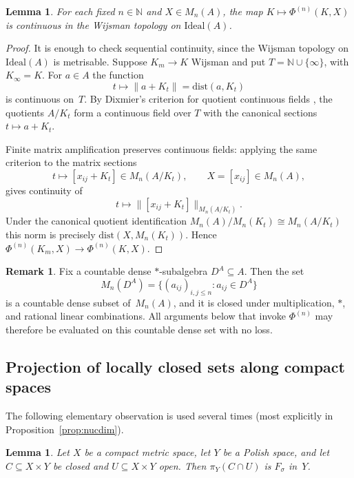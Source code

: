 \documentclass[12pt,fleqn,a4paper]{amsart}
\renewcommand{\le}{\leqslant}
\numberwithin{equation}{section}
\newtheorem{lemma}[theorem]{Lemma}
\theoremstyle{definition}
\newtheorem{remark}[theorem]{Remark}
\newcommand{\N}{\mathbb{N}}
\newcommand{\Ideal}{\mathrm{Ideal}}
\newcommand{\dist}{\mathrm{dist}}
\begin{document}
\begin{lemma}\label{lem:Phi-n-continuous}
For each fixed $n\in\N$ and $X\in M_n(A)$, the map
$K\mapsto \Phi^{(n)}(K,X)$ is continuous in the Wijsman topology on $\Ideal(A)$.
\end{lemma}

\begin{proof}
It is enough to check sequential continuity, since the Wijsman topology on
$\Ideal(A)$ is metrisable.  Suppose $K_m\to K$ Wijsman and put
$T=\N\cup\{\infty\}$, with $K_\infty=K$.  For $a\in A$ the function
\[
        t\longmapsto \|a+K_t\|=\dist(a,K_t)
\]
is continuous on~$T$.  By Dixmier's criterion for quotient continuous fields
\cite[Prop.~10.3.2]{Dixmier1977}, the quotients $A/K_t$ form a continuous field over
$T$ with the canonical sections $t\mapsto a+K_t$.

Finite matrix amplification preserves continuous fields: applying the same criterion
to the matrix sections
\[
        t\longmapsto [x_{ij}+K_t]\in M_n(A/K_t),
        \qquad X=[x_{ij}]\in M_n(A),
\]
gives continuity of
\[
        t\longmapsto \|[x_{ij}+K_t]\|_{M_n(A/K_t)}.
\]
Under the canonical quotient identification
$M_n(A)/M_n(K_t)\cong M_n(A/K_t)$ this norm is precisely
$\dist(X,M_n(K_t))$.  Hence
$\Phi^{(n)}(K_m,X)\to\Phi^{(n)}(K,X)$.
\end{proof}

\begin{remark}\label{rem:Phi-n-dense}
Fix a countable dense $*$-subalgebra $D^A\subseteq A$.  Then the set 
\[
    M_n(D^A)=\{(a_{ij})_{i,j\le n}:a_{ij}\in D^A\}
\]
is a countable dense
subset of~$M_n(A)$, and it is closed under multiplication, $*$, and rational
linear combinations.
All arguments below that invoke $\Phi^{(n)}$ may therefore be evaluated on
this countable dense set with no loss.
\end{remark}

\subsection{Projection of locally closed sets along compact spaces}

The following elementary observation is used several times (most explicitly in Proposition~\ref{prop:nucdim}).

\begin{lemma}\label{lem:proj-locally-closed}
Let $X$ be a compact metric space, let $Y$ be a Polish space, and let $C\subseteq X\times Y$ be closed and $U\subseteq X\times Y$ open.  Then $\pi_Y(C\cap U)$ is $F_\sigma$ in~$Y$.
\end{lemma}
\end{document}
